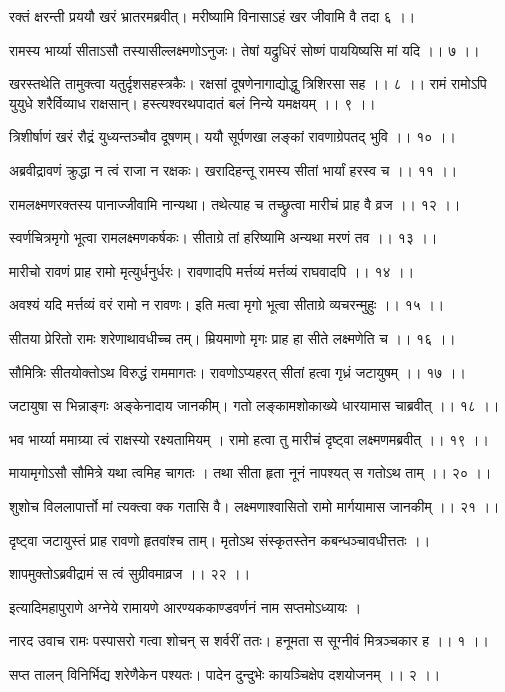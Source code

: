 रक्तं क्षरन्ती प्रययौ खरं भ्रातरमब्रवीत्।
मरीष्यामि विनासाऽहं खर जीवामि वै तदा ६ ।।

रामस्य भार्य्या सीताऽसौ तस्यासील्लक्ष्मणोऽनुजः।
तेषां यद्रुधिरं सोष्णं पाययिष्यसि मां यदि ।। ७ ।।

खरस्तथेति तामुक्त्वा यतुर्दृशसहस्त्रकैः।
रक्षसां दूषणेनागाद्योद्धु त्रिशिरसा सह ।। ८ ।।
रामं रामोऽपि युयुधे शरैर्विव्याध राक्षसान्।
हस्त्यश्वरथपादातं बलं निन्ये यमक्षयम् ।। ९ ।।

त्रिशीर्षाणं खरं रौद्रं युध्यन्तञ्चौव दूषणम्।
ययौ सूर्पणखा लङ्कां रावणाग्रेपतद् भुवि ।। १० ।।

अब्रवीद्रावणं क्रुद्धा न त्वं राजा न रक्षकः।
खरादिहन्तू रामस्य सीतां भार्यां हरस्व च ।। ११ ।।

रामलक्ष्मणरक्तस्य पानाज्जीवामि नान्यथा।
तथेत्याह च तच्छ्रुत्वा मारीचं प्राह वै व्रज ।। १२ ।।

स्वर्णचित्रमृगो भूत्वा रामलक्ष्मणकर्षकः।
सीताग्रे तां हरिष्यामि अन्यथा मरणं तव ।। १३ ।।

मारीचो रावणं प्राह रामो मृत्युर्धनुर्धरः।
रावणादपि मर्त्तव्यं मर्त्तव्यं राघवादपि ।। १४ ।।

अवश्यं यदि मर्त्तव्यं वरं रामो न रावणः।
इति मत्वा मृगो भूत्वा सीताग्रे व्यचरन्मुहुः ।। १५ ।।

सीतया प्रेरितो रामः शरेणाथावधीच्च तम्।
म्रियमाणो मृगः प्राह हा सीते लक्ष्मणेति च ।। १६ ।।

सौमित्रिः सीतयोक्तोऽथ विरुद्धं राममागतः।
रावणोऽप्यहरत् सीतां हत्वा गृध्रं जटायुषम् ।। १७ ।।

जटायुषा स भिन्नाङ्गः अङ्केनादाय जानकीम्।
गतो लङ्कामशोकाख्ये धारयामास चाब्रवीत् ।। १८ ।।

भव भार्य्या ममाग्र्या त्वं राक्षस्यो रक्ष्यतामियम् ।
रामो हत्वा तु मारीचं दृष्ट्वा लक्ष्मणमब्रवीत् ।। १९ ।।

मायामृगोऽसौ सौमित्रे यथा त्वमिह चागतः ।
तथा सीता हृता नूनं नापश्यत् स गतोऽथ ताम् ।। २० ।।

शुशोच विललापार्त्तो मां त्यक्त्वा क्क गतासि वै।
लक्ष्मणाश्वासितो रामो मार्गयामास जानकीम् ।। २१ ।।

दृष्ट्वा जटायुस्तं प्राह रावणो हृतवांश्च ताम्।
मृतोऽथ संस्कृतस्तेन कबन्धञ्चावधीत्ततः ।।

शापमुक्तोऽब्रवीद्रामं स त्वं सुग्रीवमाव्रज ।। २२ ।।

इत्यादिमहापुराणे अग्नेये रामायणे आरण्यककाण्डवर्णनं नाम सप्तमोऽध्यायः ।

नारद उवाच
रामः पस्पासरो गत्वा शोचन् स शर्वरीं ततः।
हनूमता स सूग्नीवं मित्रञ्चकार ह ।। १ ।।

सप्त तालन् विनिर्भिद्य शरेणैकेन पश्यतः।
पादेन दुन्दुभेः कायञ्चिक्षेप दशयोजनम् ।। २ ।।

